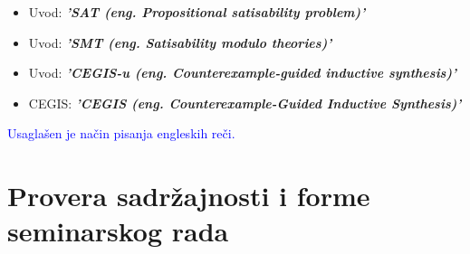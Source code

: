 \documentclass[a4paper]{report}
\newcommand{\odgovor}[1]{\textcolor{blue}{#1}}
\begin{document}
\begin{itemize}
	\item Uvod: \textbf{\textit{'SAT (eng. Propositional satisability problem)'}}
    \item Uvod: \textbf{\textit{'SMT (eng. Satisability modulo theories)'}}
	\item Uvod: \textbf{\textit{'CEGIS-u (eng. Counterexample-guided inductive synthesis)'}}
    \item CEGIS: \textbf{\textit{'CEGIS (eng. Counterexample-Guided Inductive Synthesis)'}}
\end{itemize}
\odgovor {Usaglašen je način pisanja engleskih reči.}


\section{Provera sadržajnosti i forme seminarskog rada}
\end{document}
